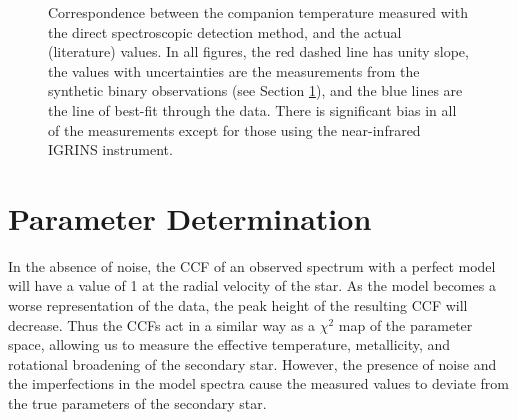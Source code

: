 \documentclass{emulateapj}
\begin{document}
\begin{figure}
{         }
         \caption{Correspondence between the companion temperature measured with the direct spectroscopic detection method, and the actual (literature) values. In all figures, the red dashed line has unity slope, the values with uncertainties are the measurements from the synthetic binary observations (see Section \ref{subsec:systematics}), and the blue lines are the line of best-fit through the data. There is significant bias in all of the measurements except for those using the near-infrared IGRINS instrument.}
         \label{fig:error}
\end{figure}

\section{Parameter Determination}
\label{subsec:systematics}



In the absence of noise, the CCF of an observed spectrum with a perfect model will have a value of 1 at the radial velocity of the star. As the model becomes a worse representation of the data, the peak height of the resulting CCF will decrease. Thus the CCFs act in a similar way as a $\chi^2$ map of the parameter space, allowing us to measure the effective temperature, metallicity, and rotational broadening of the secondary star. However, the presence of noise and the imperfections in the model spectra cause the measured values to deviate from the true parameters of the secondary star. 
\end{document}

